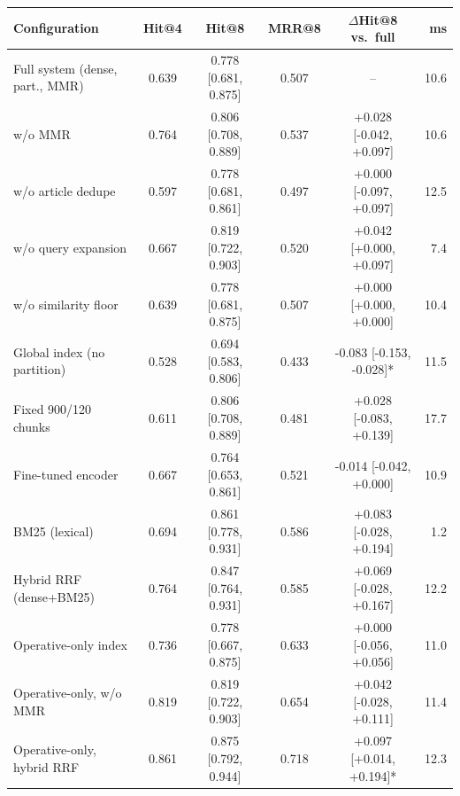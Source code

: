 \begin{tabular}{@{}lccccr@{}}
\toprule
Configuration & Hit@4 & Hit@8 & MRR@8 & $\Delta$Hit@8 vs.\ full & ms \\
\midrule
Full system (dense, part., MMR) & 0.639 & 0.778 [0.681, 0.875] & 0.507 & -- & 10.6 \\
w/o MMR & 0.764 & 0.806 [0.708, 0.889] & 0.537 & +0.028 [-0.042, +0.097] & 10.6 \\
w/o article dedupe & 0.597 & 0.778 [0.681, 0.861] & 0.497 & +0.000 [-0.097, +0.097] & 12.5 \\
w/o query expansion & 0.667 & 0.819 [0.722, 0.903] & 0.520 & +0.042 [+0.000, +0.097] & 7.4 \\
w/o similarity floor & 0.639 & 0.778 [0.681, 0.875] & 0.507 & +0.000 [+0.000, +0.000] & 10.4 \\
\midrule
Global index (no partition) & 0.528 & 0.694 [0.583, 0.806] & 0.433 & -0.083 [-0.153, -0.028]* & 11.5 \\
Fixed 900/120 chunks & 0.611 & 0.806 [0.708, 0.889] & 0.481 & +0.028 [-0.083, +0.139] & 17.7 \\
Fine-tuned encoder & 0.667 & 0.764 [0.653, 0.861] & 0.521 & -0.014 [-0.042, +0.000] & 10.9 \\
\midrule
BM25 (lexical) & 0.694 & 0.861 [0.778, 0.931] & 0.586 & +0.083 [-0.028, +0.194] & 1.2 \\
Hybrid RRF (dense+BM25) & 0.764 & 0.847 [0.764, 0.931] & 0.585 & +0.069 [-0.028, +0.167] & 12.2 \\
\midrule
Operative-only index & 0.736 & 0.778 [0.667, 0.875] & 0.633 & +0.000 [-0.056, +0.056] & 11.0 \\
Operative-only, w/o MMR & 0.819 & 0.819 [0.722, 0.903] & 0.654 & +0.042 [-0.028, +0.111] & 11.4 \\
Operative-only, hybrid RRF & 0.861 & 0.875 [0.792, 0.944] & 0.718 & +0.097 [+0.014, +0.194]* & 12.3 \\
\bottomrule
\end{tabular}